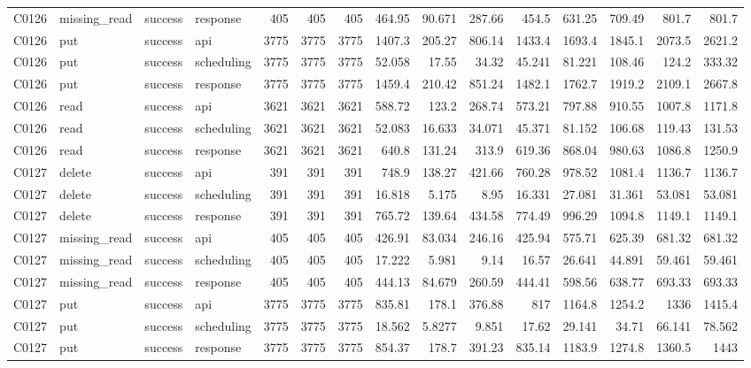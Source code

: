 \begin{landscape}
\begin{longtable}{llllrrrrrrrrrrr}
C0126 & missing\_\allowbreak{}read & success & response & 405 & 405 & 405 & 464.95 & 90.671 & 287.66 & 454.5 & 631.25 & 709.49 & 801.7 & 801.7\\
C0126 & put & success & api & 3775 & 3775 & 3775 & 1407.3 & 205.27 & 806.14 & 1433.4 & 1693.4 & 1845.1 & 2073.5 & 2621.2\\
C0126 & put & success & scheduling & 3775 & 3775 & 3775 & 52.058 & 17.55 & 34.32 & 45.241 & 81.221 & 108.46 & 124.2 & 333.32\\
C0126 & put & success & response & 3775 & 3775 & 3775 & 1459.4 & 210.42 & 851.24 & 1482.1 & 1762.7 & 1919.2 & 2109.1 & 2667.8\\
C0126 & read & success & api & 3621 & 3621 & 3621 & 588.72 & 123.2 & 268.74 & 573.21 & 797.88 & 910.55 & 1007.8 & 1171.8\\
C0126 & read & success & scheduling & 3621 & 3621 & 3621 & 52.083 & 16.633 & 34.071 & 45.371 & 81.152 & 106.68 & 119.43 & 131.53\\
C0126 & read & success & response & 3621 & 3621 & 3621 & 640.8 & 131.24 & 313.9 & 619.36 & 868.04 & 980.63 & 1086.8 & 1250.9\\
C0127 & delete & success & api & 391 & 391 & 391 & 748.9 & 138.27 & 421.66 & 760.28 & 978.52 & 1081.4 & 1136.7 & 1136.7\\
C0127 & delete & success & scheduling & 391 & 391 & 391 & 16.818 & 5.175 & 8.95 & 16.331 & 27.081 & 31.361 & 53.081 & 53.081\\
C0127 & delete & success & response & 391 & 391 & 391 & 765.72 & 139.64 & 434.58 & 774.49 & 996.29 & 1094.8 & 1149.1 & 1149.1\\
C0127 & missing\_\allowbreak{}read & success & api & 405 & 405 & 405 & 426.91 & 83.034 & 246.16 & 425.94 & 575.71 & 625.39 & 681.32 & 681.32\\
C0127 & missing\_\allowbreak{}read & success & scheduling & 405 & 405 & 405 & 17.222 & 5.981 & 9.14 & 16.57 & 26.641 & 44.891 & 59.461 & 59.461\\
C0127 & missing\_\allowbreak{}read & success & response & 405 & 405 & 405 & 444.13 & 84.679 & 260.59 & 444.41 & 598.56 & 638.77 & 693.33 & 693.33\\
C0127 & put & success & api & 3775 & 3775 & 3775 & 835.81 & 178.1 & 376.88 & 817 & 1164.8 & 1254.2 & 1336 & 1415.4\\
C0127 & put & success & scheduling & 3775 & 3775 & 3775 & 18.562 & 5.8277 & 9.851 & 17.62 & 29.141 & 34.71 & 66.141 & 78.562\\
C0127 & put & success & response & 3775 & 3775 & 3775 & 854.37 & 178.7 & 391.23 & 835.14 & 1183.9 & 1274.8 & 1360.5 & 1443\\

\end{longtable}
\end{landscape}

